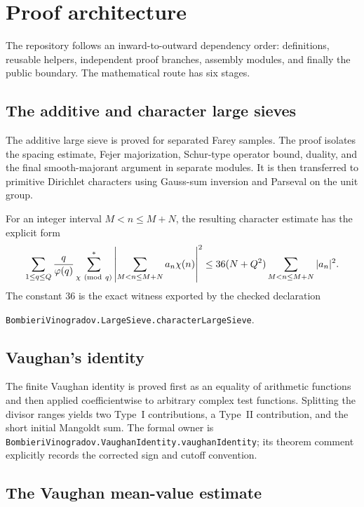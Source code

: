 \documentclass[11pt]{amsart}
\newcommand{\leanname}[1]{\nolinkurl{#1}}
\theoremstyle{definition}
\theoremstyle{remark}
\begin{document}
\section{Proof architecture}

The repository follows an inward-to-outward dependency order:
definitions, reusable helpers, independent proof branches, assembly modules,
and finally the public boundary. The mathematical route has six stages.

\subsection{The additive and character large sieves}

The additive large sieve is proved for separated Farey samples. The proof
isolates the spacing estimate, Fejer majorization, Schur-type operator bound,
duality, and the final smooth-majorant argument in separate modules. It is
then transferred to primitive Dirichlet characters using Gauss-sum inversion
and Parseval on the unit group.

For an integer interval $M<n\leq M+N$, the resulting character estimate has
the explicit form
\[
 \sum_{1\leq q\leq Q}\frac q{\varphi(q)}
 \sum_{\chi\ ({\rm mod}\ q)}^{*}
 \left|\sum_{M<n\leq M+N}a_n\chi(n)\right|^2
 \leq 36(N+Q^2)\sum_{M<n\leq M+N}|a_n|^2.
\]
The constant $36$ is the exact witness exported by the checked declaration
\begin{center}
\leanname{BombieriVinogradov.LargeSieve.characterLargeSieve}.
\end{center}

\subsection{Vaughan's identity}

The finite Vaughan identity is proved first as an equality of arithmetic
functions and then applied coefficientwise to arbitrary complex test
functions. Splitting the divisor ranges yields two Type~I contributions, a
Type~II contribution, and the short initial Mangoldt sum. The formal owner is
\leanname{BombieriVinogradov.VaughanIdentity.vaughanIdentity}; its theorem
comment explicitly records the corrected sign and cutoff convention.

\subsection{The Vaughan mean-value estimate}
\end{document}
